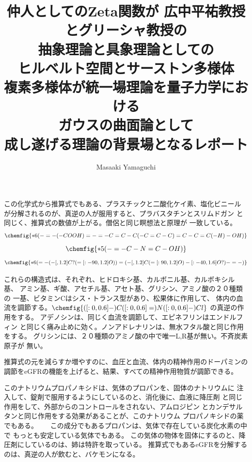 \documentclass{jsarticle}
\begin{document}
{   この化学式から推算式でもある、プラスチックと二酸化ケイ素、塩化ビニール
   が分解されるのが、真逆の人が服用すると、プラバスタチンとスリムドガン
   と同じく、推算式の数値が上がる。僧侶と同じ瞑想法と原理が
   一致している。
   $$ \chemfig{*6(-=-(-COOH)=-=-C=C-C(-C=C-C)=C-C=C(-H)-OH)} $$
   $$ \chemfig{*5(-=-C-N=C-OH)} $$
   $$ \chemfig{*6(=-(-[,1.2]C?(=[:-90,1.2]O))=
   (-[,1.2]C(=[:90,1.2]O)-[:-40,1.6]O?)-=-)} $$


     これらの構造式は、それぞれ、ヒドロキシ基、カルボニル基、カルボキシル基、
   アミン基、ギ酸、アセチル基、アセト基、グリシン、アミノ酸の２０種類の
   一基、ビタミンCはシス・トランス型があり、松果体に作用して、
   体内の血流を調節する。$ \chemfig{{}([:0,0.6]-)C([:0,0.6]=)N([:0,0.6]-)Cl} $
   の真逆の作用をする。
   アデノシンは、同じく血流を調節して、エピネフリンはエンドルフィン
   と同じく痛み止めに効く。ノンアドレナリンは、無水フタル酸と同じ作用をする。
   グリシンには、２０種類のアミノ酸の中で唯一L,R基が無い。不斉炭素原子が
   無い。


     推算式の元を減らすか増やすのに、血圧と血流、体内の精神作用のドーパミンの
   調節をeGFRの機能を上げると、結果、すべての精神作用物質が調節できる。


   このナトリウムプロパノキシドは、気体のプロパンを、固体のナトリウムに
   注入して、錠剤で服用するようにしているのと、消化後に、血液に降圧剤
   と同じ作用をして、外部からのコントロールをされない、アムロジピン
   とカンデサルタンと同じ作用をする効果があることが、このナトリウム
   プロパノキシドの薬でもある。　　
   この成分でもあるプロパンは、気体で存在している炭化水素の中で
   もっとも安定している気体でもある。
   この気体の物体を固体にするのと、降圧剤にしているのは、姉は特許を取っている。
   推算式でもあるeGFRを分解するのは、真逆の人が飲むと、バケモンになる。


\newpage
\title{仲人としてのZeta関数が 広中平祐教授とグリーシャ教授の\\ 抽象理論と具象理論としての\\ ヒルベルト空間とサーストン多様体\\ 複素多様体が統一場理論を量子力学における\\ ガウスの曲面論として\\ 成し遂げる理論の背景場となるレポート} 
\author{Masaaki Yamaguchi} 

}
\end{document}
